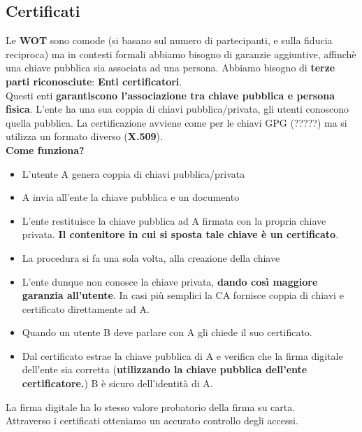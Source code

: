 \documentclass[12pt]{article}
\begin{document}
		\subsection{Certificati}
			Le \textbf{WOT} sono comode (si basano sul numero di partecipanti, e sulla fiducia reciproca) ma in contesti formali abbiamo bisogno di garanzie aggiuntive, affinchè una chiave pubblica sia associata ad una persona. Abbiamo bisogno di \textbf{terze parti riconosciute}: \textbf{Enti certificatori}.\\
			Questi enti \textbf{garantiscono l'associazione tra chiave pubblica e persona fisica}. L'ente ha una sua coppia di chiavi pubblica/privata, gli utenti conoscono quella pubblica. La certificazione avviene come per le chiavi GPG (?????) ma si utilizza un formato diverso (\textbf{X.509}). \\
			\textbf{Come funziona?}
			\begin{itemize}
				\item L'utente A genera coppia di chiavi pubblica/privata
				\item A invia all'ente la chiave pubblica e un documento
				\item L'ente restituisce la chiave pubblica ad A firmata con la propria chiave privata. \textbf{Il contenitore in cui si sposta tale chiave è un certificato}.
				\item La procedura si fa una sola volta, alla creazione della chiave
				\item L'ente dunque non conosce la chiave privata, \textbf{dando così maggiore garanzia all'utente}. In casi più semplici la CA fornisce coppia di chiavi e certificato direttamente ad A.
				\item Quando un utente B deve parlare con A gli chiede il suo certificato.
				\item Dal certificato estrae la chiave pubblica di A e verifica che la firma digitale dell'ente sia corretta (\textbf{utilizzando la chiave pubblica dell'ente certificatore.}) B è sicuro dell'identità di A.
			\end{itemize}
			La firma digitale ha lo stesso valore probatorio della firma su carta.\\
			Attraverso i certificati otteniamo un accurato controllo degli accessi.\\
			
\end{document}
